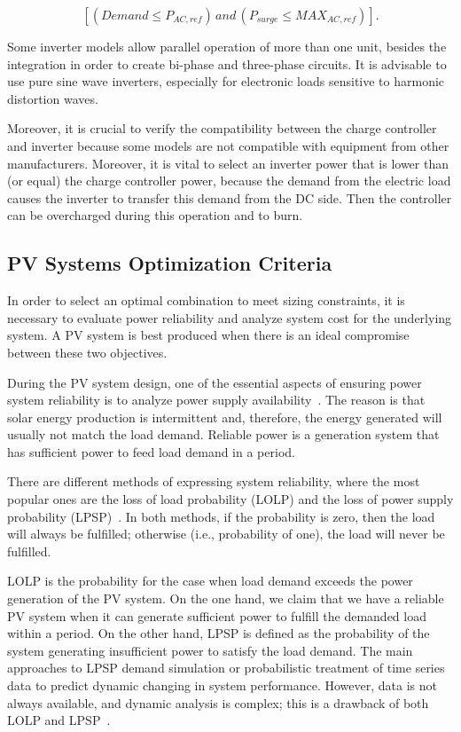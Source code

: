 \begin{equation}
\label{eq:invcheck} 
\left[ (Demand \leq P_{AC,ref}) \, and \, (P_{surge} \leq MAX_{AC,ref}) \right].
\end{equation}

Some inverter models allow parallel operation of more than one unit, besides the integration in order to create bi-phase and three-phase circuits. It is advisable to use pure sine wave inverters, especially for electronic loads sensitive to harmonic distortion waves.

Moreover, it is crucial to verify the compatibility between the charge controller and inverter because some models are not compatible with equipment from other manufacturers. Moreover, it is vital to select an inverter power that is lower than (or equal) the charge controller power, because the demand from the electric load causes the inverter to transfer this demand from the DC side. Then the controller can be overcharged during this operation and to burn.

\subsection{PV Systems Optimization Criteria}
\label{sec:optcriteria}

In order to select an optimal combination to meet sizing constraints, 
it is necessary to evaluate power reliability and analyze system cost for the underlying system. A PV system is best produced when there is an ideal compromise between these two objectives.

During the PV system design, one of the essential aspects of ensuring power system reliability is to analyze power supply availability~\cite{Alsadi2018}. The reason is that solar energy production is intermittent and, therefore, the energy generated will usually not match the load demand. Reliable power is a generation system that has sufficient power to feed load demand in a period. 

There are different methods of expressing system reliability, where the most popular ones are the loss of load probability (LOLP) and the loss of power supply probability (LPSP)~\cite{Alsadi2018}. In both methods, if the probability is zero, then the load will always be fulfilled; otherwise (i.e., probability of one), the load will never be fulfilled.

LOLP is the probability for the case when load demand exceeds the power generation of the PV system. On the one hand, we claim that we have a reliable PV system when it can generate sufficient power to fulfill the demanded load within a period. On the other hand, LPSP is defined as the probability of the system generating insufficient power to satisfy the load demand. The main approaches to LPSP demand simulation or probabilistic treatment of time series data to predict dynamic changing in system performance. However, data is not always available, and dynamic analysis is complex; this is a drawback of both LOLP and LPSP~\cite{Alsadi2018}.

